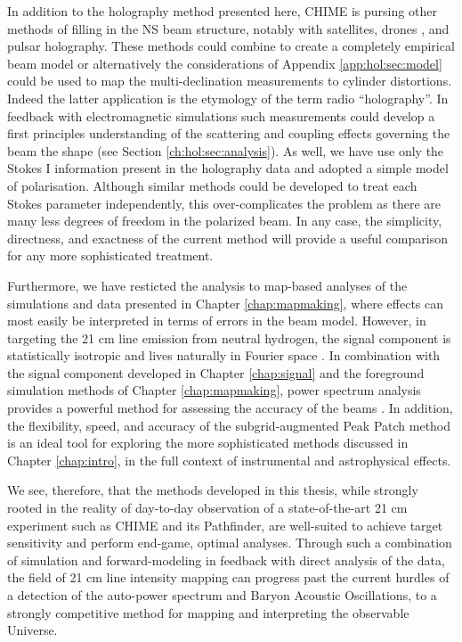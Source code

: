 In addition to the holography method presented here, CHIME is pursing other methods of filling in the NS beam structure, notably with satellites\citep{hol2, sat2}, drones \citep{drone}, and pulsar holography. These methods could combine to create a completely empirical beam model or alternatively the considerations of Appendix \ref{app:hol:sec:model} could be used to map the multi-declination measurements to cylinder distortions. Indeed the latter application is the etymology of the term radio ``holography''. In feedback with electromagnetic simulations such measurements could develop a first principles understanding of the scattering and coupling effects governing the beam the shape (see Section \ref{ch:hol:sec:analysis}). As well, we have use only the Stokes I information present in the holography data and adopted a simple model of polarisation. Although similar methods could be developed to treat each Stokes parameter independently, this over-complicates the problem as there are many less degrees of freedom in the polarized beam\citep{holpol}. In any case, the simplicity, directness, and exactness of the current method will provide a useful comparison for any more sophisticated treatment.

Furthermore, we have resticted the analysis to map-based analyses of the simulations and data presented in Chapter \ref{chap:mapmaking}, where effects can most easily be interpreted in terms of errors in the beam model. However, in targeting the 21 cm line emission from neutral hydrogen, the signal component is statistically isotropic and lives naturally in Fourier space \citep{mmodes2}. In combination with the signal component developed in Chapter \ref{chap:signal} and the foreground simulation methods of Chapter \ref{chap:mapmaking}, power spectrum analysis provides a powerful method for assessing the accuracy of the beams \citep{wedge1, wedge2}. In addition, the flexibility, speed, and accuracy of the subgrid-augmented Peak Patch method is an ideal tool for exploring the more sophisticated methods discussed in Chapter \ref{chap:intro}, in the full context of instrumental and astrophysical effects.

We see, therefore, that the methods developed in this thesis, while strongly rooted in the reality of day-to-day observation of a state-of-the-art 21 cm experiment such as CHIME and its Pathfinder, are well-suited to achieve target sensitivity and perform end-game, optimal analyses. Through such a combination of simulation and forward-modeling in feedback with direct analysis of the data, the field of 21 cm line intensity mapping can progress past the current hurdles of a detection of the auto-power spectrum and Baryon Acoustic Oscillations, to a strongly competitive method for mapping and interpreting the observable Universe.